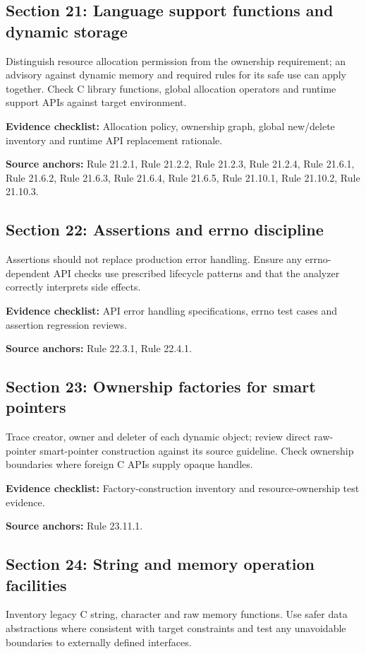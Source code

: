\documentclass[10pt,letterpaper]{article}
\begin{document}
\subsection{Section 21: Language support functions and dynamic storage}
Distinguish resource allocation permission from the ownership requirement; an advisory against dynamic memory and required rules for its safe use can apply together. Check C library functions, global allocation operators and runtime support APIs against target environment.

\textbf{Evidence checklist:} Allocation policy, ownership graph, global new/delete inventory and runtime API replacement rationale.

\textbf{Source anchors:} Rule 21.2.1, Rule 21.2.2, Rule 21.2.3, Rule 21.2.4, Rule 21.6.1, Rule 21.6.2, Rule 21.6.3, Rule 21.6.4, Rule 21.6.5, Rule 21.10.1, Rule 21.10.2, Rule 21.10.3.

\subsection{Section 22: Assertions and errno discipline}
Assertions should not replace production error handling. Ensure any errno-dependent API checks use prescribed lifecycle patterns and that the analyzer correctly interprets side effects.

\textbf{Evidence checklist:} API error handling specifications, errno test cases and assertion regression reviews.

\textbf{Source anchors:} Rule 22.3.1, Rule 22.4.1.

\subsection{Section 23: Ownership factories for smart pointers}
Trace creator, owner and deleter of each dynamic object; review direct raw-pointer smart-pointer construction against its source guideline. Check ownership boundaries where foreign C APIs supply opaque handles.

\textbf{Evidence checklist:} Factory-construction inventory and resource-ownership test evidence.

\textbf{Source anchors:} Rule 23.11.1.

\subsection{Section 24: String and memory operation facilities}
Inventory legacy C string, character and raw memory functions. Use safer data abstractions where consistent with target constraints and test any unavoidable boundaries to externally defined interfaces.
\end{document}

